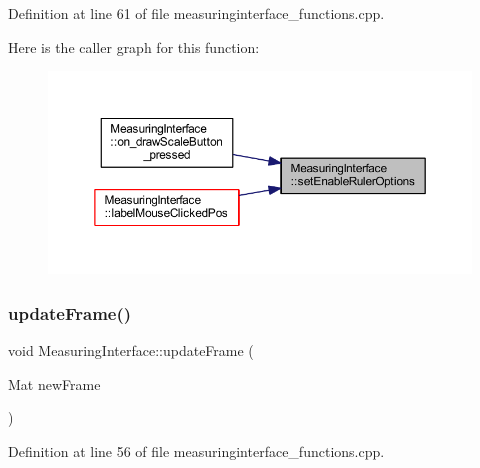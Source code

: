 Definition at line 61 of file measuringinterface\+\_\+functions.\+cpp.

Here is the caller graph for this function\+:
\nopagebreak
\begin{figure}[H]
\begin{center}
\leavevmode
\includegraphics[width=350pt]{class_measuring_interface_acf541a942e47266c30a8d473de4aca98_icgraph}
\end{center}
\end{figure}
\mbox{\label{class_measuring_interface_ac117ad50a7b325e4aff2651a6a04d1f4}} 
\subsubsection{\texorpdfstring{updateFrame()}{updateFrame()}}
{\footnotesize\ttfamily void Measuring\+Interface\+::update\+Frame (\begin{DoxyParamCaption}\item[{Mat}]{new\+Frame }\end{DoxyParamCaption})\hspace{0.3cm}{\ttfamily [private]}}



Definition at line 56 of file measuringinterface\+\_\+functions.\+cpp.

